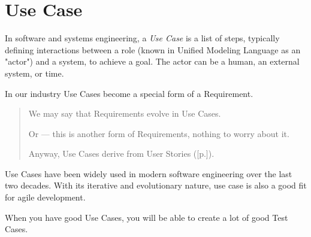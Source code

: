 \section{Use Case}
\label{sec:Use Case}

In software and systems engineering, a \emph{Use Case} is a list of steps, typically defining interactions between a role (known in Unified Modeling Language as an "actor") and a system, to achieve a goal. The actor can be a human, an external system, or time.

In our industry Use Cases become a special form of a Requirement.

\begin{quote}
We may say that Requirements evolve in Use Cases.

Or — this is another form of Requirements, nothing to worry about it.

Anyway, Use Cases derive from User Stories ([p.\pageref{sec:User Story}]).
\end{quote} 

Use Cases have been widely used in modern software engineering over the last two decades. With its iterative and evolutionary nature, use case is also a good fit for agile development.

When you have good Use Cases, you will be able to create a lot of good Test Cases.